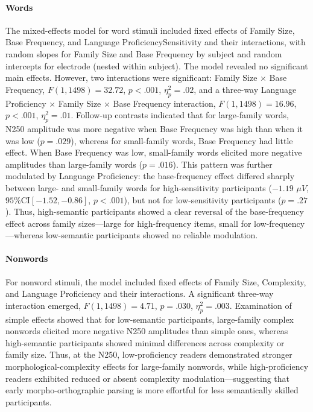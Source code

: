 \documentclass[preprint,12pt, authoryear, review]{elsarticle}
\begin{document}
\paragraph{Words}

The mixed-effects model for word stimuli included fixed effects of Family Size, Base Frequency, and Language ProficiencySensitivity and their interactions, with random slopes for Family Size and Base Frequency by subject and random intercepts for electrode (nested within subject). The model revealed no significant main effects. However, two interactions were significant: Family Size × Base Frequency, $F(1, 1498) = 32.72$, $p < .001$, $\eta_p^2 = .02$, and a three-way Language Proficiency × Family Size × Base Frequency interaction, $F(1, 1498) = 16.96$, $p < .001$, $\eta_p^2 = .01$. Follow-up contrasts indicated that for large-family words, N250 amplitude was more negative when Base Frequency was high than when it was low ($p = .029$), whereas for small-family words, Base Frequency had little effect. When Base Frequency was low, small-family words elicited more negative amplitudes than large-family words ($p = .016$). This pattern was further modulated by Language Proficiency: the base-frequency effect differed sharply between large- and small-family words for high-sensitivity participants ($-1.19$ $\mu V$, $95\% \text{CI} [-1.52, -0.86]$, $p < .001$), but not for low-sensitivity participants ($p = .27$). Thus, high-semantic participants showed a clear reversal of the base-frequency effect across family sizes—large for high-frequency items, small for low-frequency—whereas low-semantic participants showed no reliable modulation.

\paragraph{Nonwords}

For nonword stimuli, the model included fixed effects of Family Size, Complexity, and Language Proficiency and their interactions. A significant three-way interaction emerged, $F(1, 1498) = 4.71$, $p = .030$, $\eta_p^2 = .003$. Examination of simple effects showed that for low-semantic participants, large-family complex nonwords elicited more negative N250 amplitudes than simple ones, whereas high-semantic participants showed minimal differences across complexity or family size. Thus, at the N250, low-proficiency readers demonstrated stronger morphological-complexity effects for large-family nonwords, while high-proficiency readers exhibited reduced or absent complexity modulation—suggesting that early morpho-orthographic parsing is more effortful for less semantically skilled participants.
\end{document}
